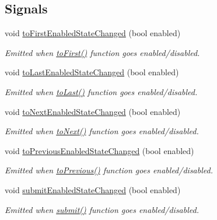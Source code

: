 \subsection*{Signals}
\begin{DoxyCompactItemize}
\item 
void \hyperlink{classmdt_abstract_sql_widget_acc3e3e7e848a92a4a117f7147bc1f3c5}{toFirstEnabledStateChanged} (bool enabled)
\begin{DoxyCompactList}\small\item\em Emitted when \hyperlink{classmdt_abstract_sql_widget_aaa27731864dbb9123ec6765dd21feb7f}{toFirst()} function goes enabled/disabled. \end{DoxyCompactList}\item 
void \hyperlink{classmdt_abstract_sql_widget_a9b7e32907ed336c74746f7a5c6d87d92}{toLastEnabledStateChanged} (bool enabled)
\begin{DoxyCompactList}\small\item\em Emitted when \hyperlink{classmdt_abstract_sql_widget_a681cc6234976eaa2f0e158248569b502}{toLast()} function goes enabled/disabled. \end{DoxyCompactList}\item 
void \hyperlink{classmdt_abstract_sql_widget_a388c169696cea80ac170b0ee060e4c9f}{toNextEnabledStateChanged} (bool enabled)
\begin{DoxyCompactList}\small\item\em Emitted when \hyperlink{classmdt_abstract_sql_widget_a8ed6bb811c992fcc8bba8da9f675cd88}{toNext()} function goes enabled/disabled. \end{DoxyCompactList}\item 
void \hyperlink{classmdt_abstract_sql_widget_acf241c34dcca6d283c8c1bf297841766}{toPreviousEnabledStateChanged} (bool enabled)
\begin{DoxyCompactList}\small\item\em Emitted when \hyperlink{classmdt_abstract_sql_widget_a342b13a8258536d228f8522dae2b9df7}{toPrevious()} function goes enabled/disabled. \end{DoxyCompactList}\item 
void \hyperlink{classmdt_abstract_sql_widget_acacc59096ae48f733be577a96cd2d14a}{submitEnabledStateChanged} (bool enabled)
\begin{DoxyCompactList}\small\item\em Emitted when \hyperlink{classmdt_abstract_sql_widget_a6678c45b0d46eb163f5b09d79ed001b5}{submit()} function goes enabled/disabled. \end{DoxyCompactList}\item 

\end{DoxyCompactItemize}
